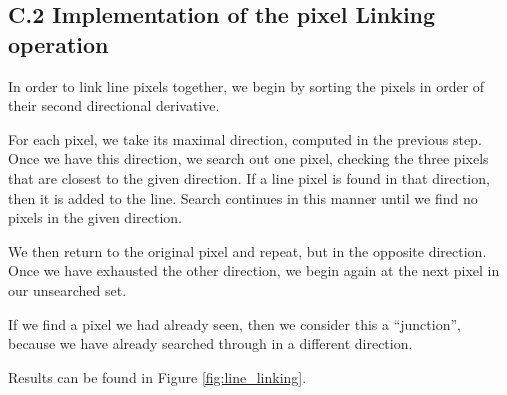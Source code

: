 \documentclass{article}
\begin{document}
\subsection*{C.2 Implementation of the pixel Linking operation}

In order to link line pixels together, we begin by sorting the pixels in order of their second directional derivative.

For each pixel, we take its maximal direction, computed in the previous step. Once we have this direction, we search out one pixel, checking the three pixels that are closest to the given direction. If a line pixel is found in that direction, then it is added to the line. Search continues in this manner until we find no pixels in the given direction.

We then return to the original pixel and repeat, but in the opposite direction. Once we have exhausted the other direction, we begin again at the next pixel in our unsearched set.

If we find a pixel we had already seen, then we consider this a ``junction'', because we have already searched through in a different direction.

Results can be found in Figure \ref{fig:line_linking}.
\end{document}
